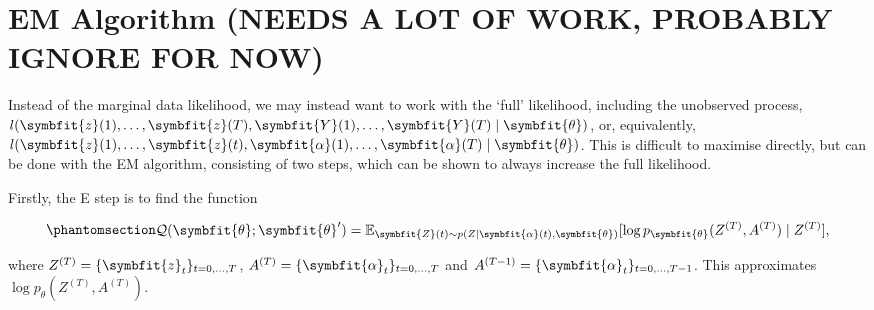 \documentclass[
]{report}
\newcommand{\bv}[1]{\symbfit{#1}}
\theoremstyle{plain}
\theoremstyle{plain}
\theoremstyle{plain}
\theoremstyle{remark}
\begin{document}
\chapter{EM Algorithm (NEEDS A LOT OF WORK, PROBABLY IGNORE FOR
NOW)}\label{em-algorithm-needs-a-lot-of-work-probably-ignore-for-now}

Instead of the marginal data likelihood, we may instead want to work
with the `full' likelihood, including the unobserved process,
\(l(\bv z(1),\dots, \bv z(T), \bv Y(1), \dots, \bv Y(T)\mid \bv\theta)\),
or, equivalently,
\(l(\bv z(1),\dots, \bv z(t), \bv \alpha(1), \dots, \bv\alpha(T)\mid \bv\theta)\).
This is difficult to maximise directly, but can be done with the EM
algorithm, consisting of two steps, which can be shown to always
increase the full likelihood.

Firstly, the E step is to find the function

\begin{equation}\phantomsection\label{eq-Qdef}{\begin{split}
\mathcal Q(\bv \theta; \bv \theta') = \mathbb E_{\bv Z(t)\sim p(Z \mid \bv\alpha(t),\bv\theta)}[\log p_{\bv\theta}(Z^{(T)}, A^{(T)})\mid Z^{(T)}],
\end{split}
}\end{equation}

where \(Z^{(T)} = \{\bv z_t\}_{t=0,\dots,T}\),
\(A^{(T)} = \{\bv \alpha_t\}_{t=0,\dots,T}\) and
\(A^{(T-1)} = \{\bv \alpha_t\}_{t=0,\dots,T-1}\). This approximates
\(\log p_\theta(Z^{(T)}, A^{(T)})\).
\end{document}
